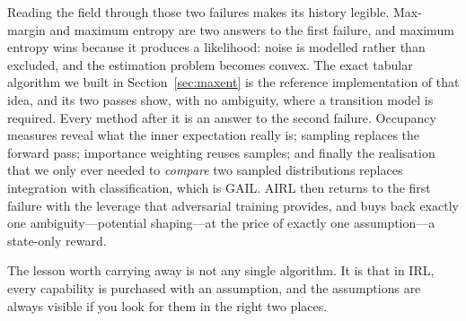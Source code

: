 \documentclass[11pt]{article}
\theoremstyle{plain}
\theoremstyle{definition}
\theoremstyle{remark}
\begin{document}
Reading the field through those two failures makes its history legible.
Max-margin and maximum entropy are two answers to the first failure, and
maximum entropy wins because it produces a likelihood: noise is modelled
rather than excluded, and the estimation problem becomes convex. The exact
tabular algorithm we built in Section~\ref{sec:maxent} is the reference
implementation of that idea, and its two passes show, with no ambiguity,
where a transition model is required. Every method after it is an answer
to the second failure. Occupancy measures reveal what the inner
expectation really is; sampling replaces the forward pass; importance
weighting reuses samples; and finally the realisation that we only ever
needed to \emph{compare} two sampled distributions replaces integration
with classification, which is GAIL. AIRL then returns to the first
failure with the leverage that adversarial training provides, and buys
back exactly one ambiguity---potential shaping---at the price of exactly
one assumption---a state-only reward.

The lesson worth carrying away is not any single algorithm. It is that in
IRL, every capability is purchased with an assumption, and the
assumptions are always visible if you look for them in the right two
places.
\end{document}
